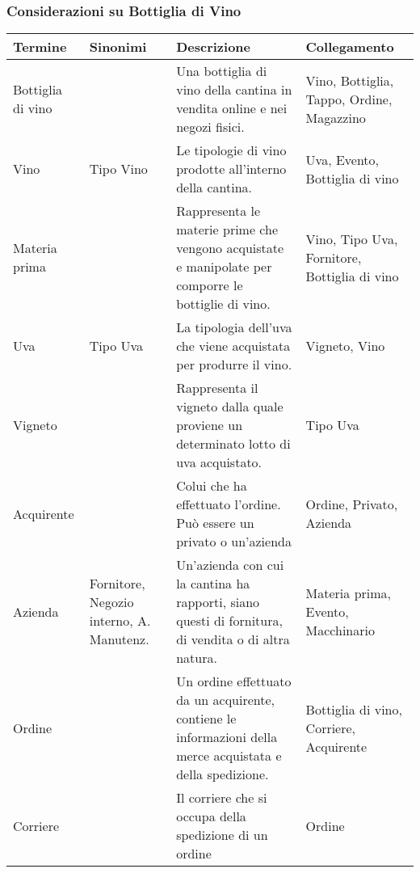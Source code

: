 \subsubsection{Considerazioni su Bottiglia di Vino}


\begin{center}
	\begin{longtable}{P{2cm}P{2cm}P{6cm}P{4cm}}
		\toprule
		 Termine & Sinonimi & Descrizione & Collegamento \\
		
		\midrule
		Bottiglia di vino & & Una bottiglia di vino della cantina in vendita online e nei negozi fisici. & Vino, Bottiglia, Tappo, Ordine, Magazzino\\
		\midrule
		Vino & Tipo Vino & Le tipologie di vino prodotte all'interno della cantina. & Uva, Evento, Bottiglia di vino \\
		
		\midrule
		Materia prima & & Rappresenta le materie prime che vengono acquistate e manipolate per comporre le bottiglie di vino. &  Vino, Tipo Uva, Fornitore, Bottiglia di vino\\
		
		\midrule
		Uva & Tipo Uva & La tipologia dell'uva che viene acquistata per produrre il vino. &  Vigneto, Vino\\
		
		\midrule
		Vigneto & & Rappresenta il vigneto dalla quale proviene un determinato lotto di uva acquistato. &  Tipo Uva\\

		\midrule
		Acquirente & & Colui che ha effettuato l'ordine. Può essere un privato o un'azienda &  Ordine, Privato, Azienda\\

		\midrule
		Azienda & Fornitore, Negozio interno, A. Manutenz. & Un'azienda con cui la cantina ha rapporti, siano questi di fornitura, di vendita o di altra natura. &  Materia prima, Evento, Macchinario\\

		\midrule
		Ordine & & Un ordine effettuato da un acquirente, contiene le informazioni della merce acquistata e della spedizione. &  Bottiglia di vino, Corriere, Acquirente\\
		
		\midrule
		Corriere & & Il corriere che si occupa della spedizione di un ordine & Ordine\\
		\midrule
		

\end{longtable}
\end{center}
